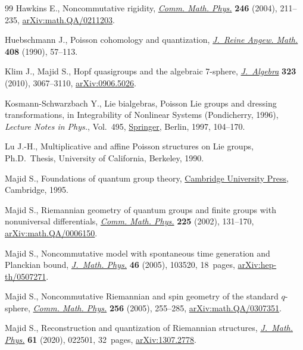 \begin{thebibliography}{99}
Hawkins E., Noncommutative rigidity, \href{https://doi.org/10.1007/s00220-004-1036-4}{\textit{Comm. Math. Phys.}} \textbf{246}
 (2004), 211--235, \href{https://arxiv.org/abs/math.QA/0211203}{arXiv:math.QA/0211203}.

Huebschmann J., Poisson cohomology and quantization, \href{https://doi.org/10.1515/crll.1990.408.57}{\textit{J.~Reine Angew.
 Math.}} \textbf{408} (1990), 57--113.

Klim J., Majid S., Hopf quasigroups and the algebraic 7-sphere,
 \href{https://doi.org/10.1016/j.jalgebra.2010.03.011}{\textit{J.~Algebra}} \textbf{323} (2010), 3067--3110, \href{https://arxiv.org/abs/0906.5026}{arXiv:0906.5026}.

Kosmann-Schwarzbach Y., Lie bialgebras, {P}oisson {L}ie groups and dressing
 transformations, in Integrability of Nonlinear Systems ({P}ondicherry, 1996),
 \textit{Lecture Notes in Phys.}, Vol.~495, \href{https://doi.org/10.1007/BFb0113695}{Springer}, Berlin, 1997, 104--170.

Lu J.-H., Multiplicative and affine {P}oisson structures on {L}ie groups, Ph.D.~Thesis, {U}niversity of California, Berkeley, 1990.

Majid S., Foundations of quantum group theory, \href{https://doi.org/10.1017/CBO9780511613104}{Cambridge University Press},
 Cambridge, 1995.

Majid S., Riemannian geometry of quantum groups and finite groups with
 nonuniversal differentials, \href{https://doi.org/10.1007/s002201000564}{\textit{Comm. Math. Phys.}} \textbf{225} (2002),
 131--170, \href{https://arxiv.org/abs/math.QA/0006150}{arXiv:math.QA/0006150}.

Majid S., Noncommutative model with spontaneous time generation and {P}lanckian
 bound, \href{https://doi.org/10.1063/1.2084748}{\textit{J.~Math. Phys.}} \textbf{46} (2005), 103520, 18~pages,
 \href{https://arxiv.org/abs/hep-th/0507271}{arXiv:hep-th/0507271}.

Majid S., Noncommutative {R}iemannian and spin geometry of the standard
 {$q$}-sphere, \href{https://doi.org/10.1007/s00220-005-1295-8}{\textit{Comm. Math. Phys.}} \textbf{256} (2005), 255--285,
 \href{https://arxiv.org/abs/math.QA/0307351}{arXiv:math.QA/0307351}.

Majid S., Reconstruction and quantization of {R}iemannian structures,
 \href{https://doi.org/10.1063/1.5123258}{\textit{J.~Math. Phys.}} \textbf{61} (2020), 022501, 32~pages,
 \href{https://arxiv.org/abs/1307.2778}{arXiv:1307.2778}.


\end{thebibliography}
